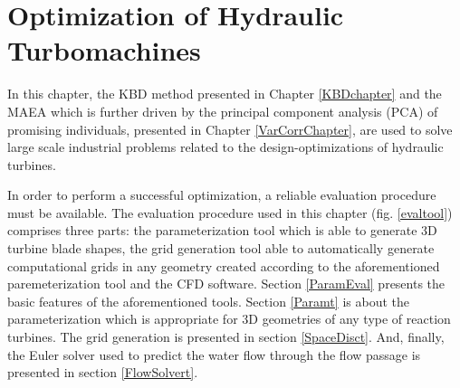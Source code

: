 \ifpdf
    \graphicspath{{5/figures/PNG/}{5/figures/PDF/}{4/figures/}}
\else
    \graphicspath{{5/figures/EPS/}{5/figures/}}
\fi

\chapter{Optimization of Hydraulic Turbomachines} %

In this chapter, the KBD method presented in Chapter \ref{KBDchapter} and the MAEA which is further driven by the principal component analysis (PCA) of promising individuals, presented in Chapter \ref{VarCorrChapter}, are used to solve large scale industrial problems related to the design-optimizations  of hydraulic turbines. 

In order to perform a successful optimization, a reliable evaluation procedure must be available. The evaluation procedure used in this chapter (fig. \ref{evaltool}) comprises three parts: the parameterization tool which is able to generate 3D turbine blade shapes, the grid generation tool able to automatically generate computational grids in any geometry created according to the aforementioned paremeterization tool and the CFD software. Section \ref{ParamEval} presents the basic features of the aforementioned tools. Section \ref{Paramt} is about the  parameterization  which is appropriate for 3D geometries of any type of reaction turbines. The grid generation is presented in section \ref{SpaceDisct}. And, finally, the Euler solver used to predict the water flow through the flow passage is presented in section \ref{FlowSolvert}.

